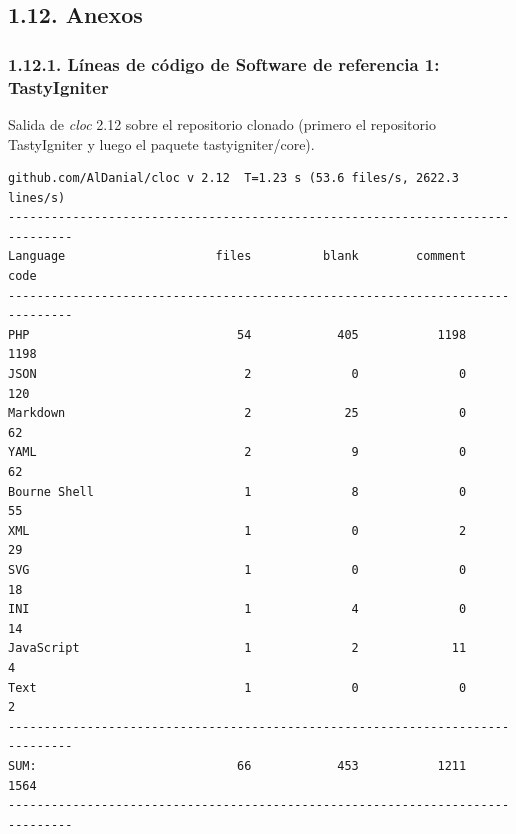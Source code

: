 \subsection{1.12. Anexos}

\subsubsection{1.12.1. Líneas de código de Software de referencia 1: TastyIgniter}

Salida de \textit{cloc} 2.12 sobre el repositorio clonado (primero el repositorio TastyIgniter y luego el paquete tastyigniter/core).

\begingroup\footnotesize
\begin{verbatim}
github.com/AlDanial/cloc v 2.12  T=1.23 s (53.6 files/s, 2622.3 lines/s)
-------------------------------------------------------------------------------
Language                     files          blank        comment           code
-------------------------------------------------------------------------------
PHP                             54            405           1198           1198
JSON                             2              0              0            120
Markdown                         2             25              0             62
YAML                             2              9              0             62
Bourne Shell                     1              8              0             55
XML                              1              0              2             29
SVG                              1              0              0             18
INI                              1              4              0             14
JavaScript                       1              2             11              4
Text                             1              0              0              2
-------------------------------------------------------------------------------
SUM:                            66            453           1211           1564
-------------------------------------------------------------------------------


\end{verbatim}
